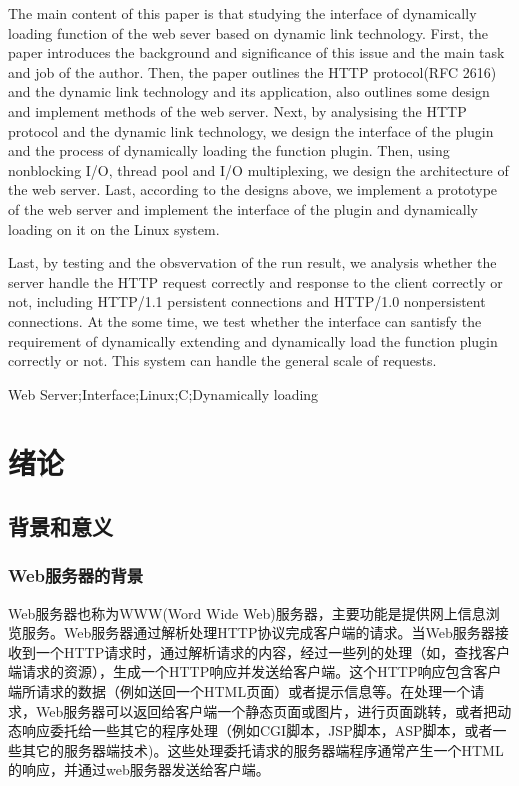 \documentclass[12pt, twoside, a4paper, xetex]{report}
\begin{document}
	The main content of this paper is that studying the interface of dynamically loading function of the web sever based on dynamic link technology. First, the paper introduces the background and significance of this issue and the main task and job of the author. Then, the paper outlines the HTTP protocol(RFC 2616) and the dynamic link technology and its application, also outlines some design and implement methods of the web server. Next, by analysising the HTTP protocol and the dynamic link technology, we design the interface of the plugin and the process of dynamically loading the function plugin. Then, using nonblocking I/O, thread pool and I/O multiplexing, we design the architecture of the web server. Last, according to the designs above, we implement a prototype of the web server and implement the interface of the plugin and dynamically loading on it on the Linux system.
	
	Last, by testing and the obsvervation of the run result, we analysis whether the server handle the HTTP request correctly and response to the client correctly or not, including HTTP/1.1 persistent connections and HTTP/1.0 nonpersistent connections. At the some time, we test whether the interface can santisfy the requirement of dynamically extending and dynamically load the function plugin correctly or not. This system can handle the general scale of requests.


{\enkeywords Web Server;Interface;Linux;C;Dynamically loading}

\newpage
\tableofcontents

\chapter{绪论}

\section{背景和意义}
\subsection{Web服务器的背景}
	Web服务器也称为WWW(Word Wide Web)服务器，主要功能是提供网上信息浏览服务。Web服务器通过解析处理HTTP协议完成客户端的请求。当Web服务器接收到一个HTTP请求时，通过解析请求的内容，经过一些列的处理（如，查找客户端请求的资源），生成一个HTTP响应并发送给客户端。这个HTTP响应包含客户端所请求的数据（例如送回一个HTML页面）或者提示信息等。在处理一个请求，Web服务器可以返回给客户端一个静态页面或图片，进行页面跳转，或者把动态响应委托给一些其它的程序处理（例如CGI脚本，JSP脚本，ASP脚本，或者一些其它的服务器端技术)。这些处理委托请求的服务器端程序通常产生一个HTML的响应，并通过web服务器发送给客户端。
	
\end{document}
